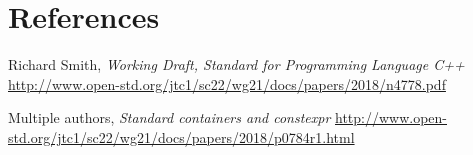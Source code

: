 \documentclass{wg21}
\begin{document}
\section{References}
\renewcommand{\section}[2]{}%
\begin{thebibliography}{9}

    Richard Smith,
    \emph{Working Draft, Standard for Programming Language C++}\newline
    \url{http://www.open-std.org/jtc1/sc22/wg21/docs/papers/2018/n4778.pdf}

    Multiple authors,
    \emph{Standard containers and constexpr}\newline
    \url{http://www.open-std.org/jtc1/sc22/wg21/docs/papers/2018/p0784r1.html}

\end{thebibliography}
\end{document}
